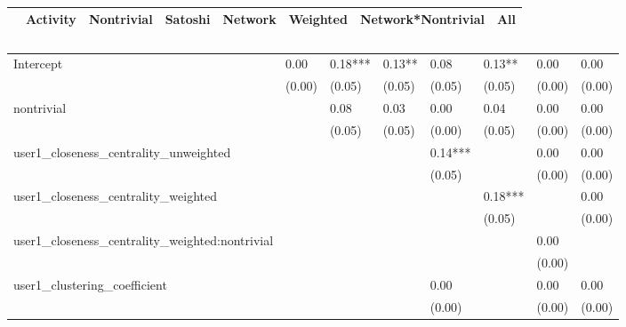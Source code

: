 \begin{table}
\caption{}
\begin{center}
\begin{tabular}{lccccccc}
\hline
                                               & Activity & Nontrivial & Satoshi & Network & Weighted & Network*Nontrivial &  All    \\
\hline
\hline
\end{tabular}
\begin{tabular}{llllllll}
Intercept                                      & 0.00     & 0.18***    & 0.13**  & 0.08    & 0.13**   & 0.00               & 0.00    \\
                                               & (0.00)   & (0.05)     & (0.05)  & (0.05)  & (0.05)   & (0.00)             & (0.00)  \\
nontrivial                                     &          & 0.08       & 0.03    & 0.00    & 0.04     & 0.00               & 0.00    \\
                                               &          & (0.05)     & (0.05)  & (0.00)  & (0.05)   & (0.00)             & (0.00)  \\
user1_closeness_centrality_unweighted          &          &            &         & 0.14*** &          & 0.00               & 0.00    \\
                                               &          &            &         & (0.05)  &          & (0.00)             & (0.00)  \\
user1_closeness_centrality_weighted            &          &            &         &         & 0.18***  &                    & 0.00    \\
                                               &          &            &         &         & (0.05)   &                    & (0.00)  \\
user1_closeness_centrality_weighted:nontrivial &          &            &         &         &          & 0.00               &         \\
                                               &          &            &         &         &          & (0.00)             &         \\
user1_clustering_coefficient                   &          &            &         & 0.00    &          & 0.00               & 0.00    \\
                                               &          &            &         & (0.00)  &          & (0.00)             & (0.00)  \\

\end{tabular}
\end{center}
\end{table}
